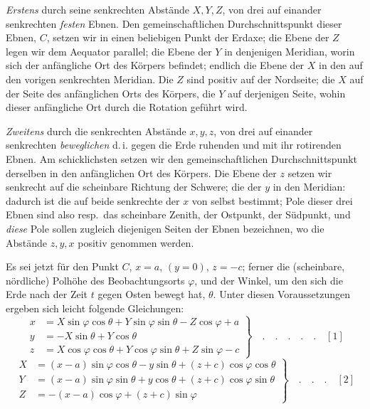\textit{Erstens} durch seine senkrechten Abstände $X,Y,Z$, von drei auf einander senkrechten \textit{festen} Ebnen. Den gemeinschaftlichen Durchschnittspunkt dieser Ebnen, $C$, setzen wir in einen beliebigen Punkt der Erdaxe; die Ebene der $Z$ legen wir dem Aequator parallel; die Ebene der $Y$ in denjenigen Meridian, worin sich der anfängliche Ort des Körpers befindet; endlich die Ebene der $X$ in den auf den vorigen senkrechten Meridian. Die $Z$ sind positiv auf der Nordseite; die $X$ auf der Seite des anfänglichen Orts des Körpers, die $Y$ auf derjenigen Seite, wohin dieser anfängliche Ort durch die Rotation geführt wird.

\textit{Zweitens} durch die senkrechten Abstände $x,y,z$, von drei auf einander senkrechten \textit{beweglichen} d.\,i. gegen die Erde ruhenden und mit ihr rotirenden Ebnen. Am schicklichsten setzen wir den gemeinschaftlichen Durchschnittspunkt derselben in den anfänglichen Ort des Körpers. Die Ebene der $z$ setzen wir senkrecht auf die scheinbare Richtung der Schwere; die der $y$ in den Meridian: dadurch ist die auf beide senkrechte der $x$ von selbst bestimmt; Pole dieser drei Ebnen sind also resp.\ das scheinbare Zenith, der Ostpunkt, der Südpunkt, und \textit{diese} Pole sollen zugleich diejenigen Seiten der Ebnen bezeichnen, wo die Abstände $z,y,x$ positiv genommen werden.

Es sei jetzt für den Punkt $C$, $x=a$, $(y=0)$, $z=-c$; ferner die (scheinbare, nördliche) Polhöhe des Beobachtungsorts $\varphi$, und der Winkel, um den sich die Erde nach der Zeit $t$ gegen Osten bewegt hat, $\theta$. Unter diesen Voraussetzungen ergeben sich leicht folgende Gleichungen:
\[
\left.\begin{aligned}
x&=X\sin\varphi\cos\theta+Y\sin\varphi\sin\theta-Z\cos\varphi+a\\
y&=-X\sin\theta+Y\cos\theta\\
z&=X\cos\varphi\cos\theta+Y\cos\varphi\sin\theta+Z\sin\varphi-c
\end{aligned}\right\}\quad.\quad.\quad.\quad.\quad.\quad[1]
\]
\[
\left.\begin{aligned}
X&=(x-a)\sin\varphi\cos\theta-y\sin\theta+(z+c)\cos\varphi\cos\theta\\
Y&=(x-a)\sin\varphi\sin\theta+y\cos\theta+(z+c)\cos\varphi\sin\theta\\
Z&=-(x-a)\cos\varphi+(z+c)\sin\varphi
\end{aligned}\right\}\quad.\quad.\quad.\quad[2]
\]

